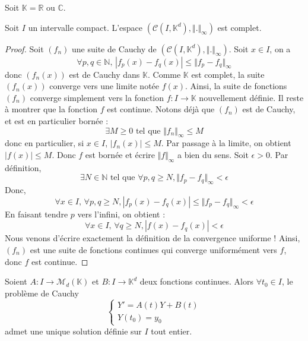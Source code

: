 




  Soit $\mathbb{K} = \mathbb{R}$ ou $\mathbb{C}$.

  \begin{lemma}
    Soit $I$ un intervalle compact. L'espace $(\mathcal{C} (I, \mathbb{K}^d), \Vert . \Vert_{\infty})$ est complet.
  \end{lemma}

  \begin{proof}
    Soit $(f_n)$ une suite de Cauchy de $(\mathcal{C} (I, \mathbb{K}^d), \Vert . \Vert_{\infty})$. Soit $x \in I$, on a
    \[ \forall p, q \in \mathbb{N}, \, |f_p(x) - f_q(x)| \leq \Vert f_p - f_q \Vert_\infty \]
    donc $(f_n(x))$ est de Cauchy dans $\mathbb{K}$. Comme $\mathbb{K}$ est complet, la suite $(f_n(x))$ converge vers une limite notée $f(x)$. Ainsi, la suite de fonctions $(f_n)$ converge simplement vers la fonction $f : I \rightarrow \mathbb{K}$ nouvellement définie. Il reste à montrer que la fonction $f$ est continue.
    \newpar
    Notons déjà que $(f_n)$ est de Cauchy, et est en particulier bornée :
    \[ \exists M \geq 0 \text{ tel que } \Vert f_n \Vert_\infty \leq M \]
    donc en particulier, si $x \in I$, $|f_n(x)| \leq M$. Par passage à la limite, on obtient $|f(x)| \leq M$. Donc $f$ est bornée et écrire $\Vert f \Vert_{\infty}$ a bien du sens.
    \newpar
    Soit $\epsilon > 0$. Par définition,
    \[ \exists N \in \mathbb{N} \text{ tel que } \forall p, q \geq N, \Vert f_p - f_q \Vert_\infty < \epsilon \]
    Donc,
    \[ \forall x \in I, \, \forall p, q \geq N, |f_p(x) - f_q(x)| \leq \Vert f_p - f_q \Vert_\infty < \epsilon \]
    En faisant tendre $p$ vers l'infini, on obtient :
    \[ \forall x \in I, \, \forall q \geq N, |f(x) - f_q(x)| < \epsilon \]
    Nous venons d'écrire exactement la définition de la convergence uniforme ! Ainsi, $(f_n)$ est une suite de fonctions continues qui converge uniformément vers $f$, donc $f$ est continue.
  \end{proof}


  \begin{theorem}
    Soient $A : I \rightarrow \mathcal{M}_d(\mathbb{K})$ et $B : I \rightarrow \mathbb{K}^d$ deux fonctions continues. Alors $\forall t_0 \in I$, le problème de Cauchy
    \[ \begin{cases} Y' = A(t)Y + B(t) \\ Y(t_0) = y_0 \end{cases} \tag{$C$} \]
    admet une unique solution définie sur $I$ tout entier.
  \end{theorem}

